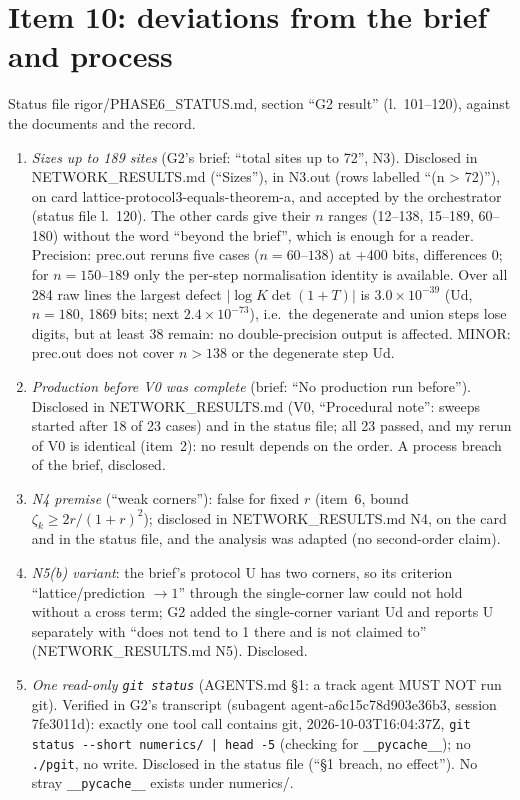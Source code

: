 \documentclass[11pt]{article}
\begin{document}
\section{Item 10: deviations from the brief and process}\label{sec:i10}
Status file rigor/PHASE6\_STATUS.md, section ``G2 result'' (l.~101--120), against the documents and the record.
\begin{enumerate}[label=(\alph*),leftmargin=2em]
\item \emph{Sizes up to 189 sites} (G2's brief: ``total sites up to 72'', N3). Disclosed in NETWORK\_RESULTS.md
 (``Sizes''), in N3.out (rows labelled ``(n > 72)''), on card lattice-protocol3-equals-theorem-a, and accepted by the
 orchestrator (status file l.~120). The other cards give their $n$ ranges (12--138, 15--189, 60--180) without the
 word ``beyond the brief'', which is enough for a reader. Precision: prec.out reruns five cases ($n=60$--$138$) at
 +400 bits, differences 0; for $n=150$--$189$ only the per-step normalisation identity is available. Over all 284
 raw lines the largest defect $|\log K\det(1+T)|$ is $3.0\times10^{-39}$ (Ud, $n=180$, 1869 bits; next
 $2.4\times10^{-73}$), i.e.\ the degenerate and union steps lose digits, but at least 38 remain: no double-precision
 output is affected. MINOR: prec.out does not cover $n>138$ or the degenerate step Ud.
\item \emph{Production before V0 was complete} (brief: ``No production run before''). Disclosed in NETWORK\_RESULTS.md
 (V0, ``Procedural note'': sweeps started after 18 of 23 cases) and in the status file; all 23 passed, and my rerun of
 V0 is identical (item~2): no result depends on the order. A process breach of the brief, disclosed.
\item \emph{N4 premise} (``weak corners''): false for fixed $r$ (item~6, bound $\zeta_k\ge2r/(1+r)^2$); disclosed in
 NETWORK\_RESULTS.md N4, on the card and in the status file, and the analysis was adapted (no second-order claim).
\item \emph{N5(b) variant}: the brief's protocol U has two corners, so its criterion ``lattice/prediction $\to1$'' through
 the single-corner law could not hold without a cross term; G2 added the single-corner variant Ud and reports U
 separately with ``does not tend to 1 there and is not claimed to'' (NETWORK\_RESULTS.md N5). Disclosed.
\item \emph{One read-only \texttt{git status}} (AGENTS.md \S1: a track agent MUST NOT run git). Verified in G2's
 transcript (subagent agent-a6c15c78d903e36b3, session 7fe3011d): exactly one tool call contains git,
 2026-10-03T16:04:37Z, \texttt{git status -{}-short numerics/ | head -5} (checking for \texttt{\_\_pycache\_\_}); no
 \texttt{./pgit}, no write. Disclosed in the status file (``§1 breach, no effect''). No stray
 \texttt{\_\_pycache\_\_} exists under numerics/.
\end{enumerate}
\end{document}

